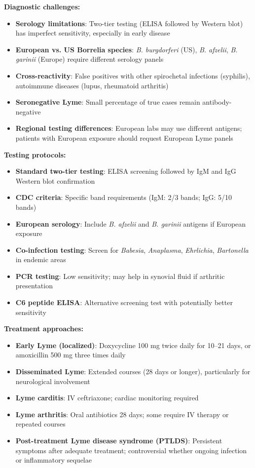 \begin{observation}
\textbf{Diagnostic challenges:}
\begin{itemize}
    \item \textbf{Serology limitations}: Two-tier testing (ELISA followed by Western blot) has imperfect sensitivity, especially in early disease
    \item \textbf{European vs. US Borrelia species}: \textit{B. burgdorferi} (US), \textit{B. afzelii}, \textit{B. garinii} (Europe) require different serology panels
    \item \textbf{Cross-reactivity}: False positives with other spirochetal infections (syphilis), autoimmune diseases (lupus, rheumatoid arthritis)
    \item \textbf{Seronegative Lyme}: Small percentage of true cases remain antibody-negative
    \item \textbf{Regional testing differences}: European labs may use different antigens; patients with European exposure should request European Lyme panels
\end{itemize}

\textbf{Testing protocols:}
\begin{itemize}
    \item \textbf{Standard two-tier testing}: ELISA screening followed by IgM and IgG Western blot confirmation
    \item \textbf{CDC criteria}: Specific band requirements (IgM: 2/3 bands; IgG: 5/10 bands)
    \item \textbf{European serology}: Include \textit{B. afzelii} and \textit{B. garinii} antigens if European exposure
    \item \textbf{Co-infection testing}: Screen for \textit{Babesia}, \textit{Anaplasma}, \textit{Ehrlichia}, \textit{Bartonella} in endemic areas
    \item \textbf{PCR testing}: Low sensitivity; may help in synovial fluid if arthritic presentation
    \item \textbf{C6 peptide ELISA}: Alternative screening test with potentially better sensitivity
\end{itemize}

\textbf{Treatment approaches:}
\begin{itemize}
    \item \textbf{Early Lyme (localized)}: Doxycycline 100 mg twice daily for 10--21 days, or amoxicillin 500 mg three times daily
    \item \textbf{Disseminated Lyme}: Extended courses (28 days or longer), particularly for neurological involvement
    \item \textbf{Lyme carditis}: IV ceftriaxone; cardiac monitoring required
    \item \textbf{Lyme arthritis}: Oral antibiotics 28 days; some require IV therapy or repeated courses
    \item \textbf{Post-treatment Lyme disease syndrome (PTLDS)}: Persistent symptoms after adequate treatment; controversial whether ongoing infection or inflammatory sequelae
\end{itemize}


\end{observation}
